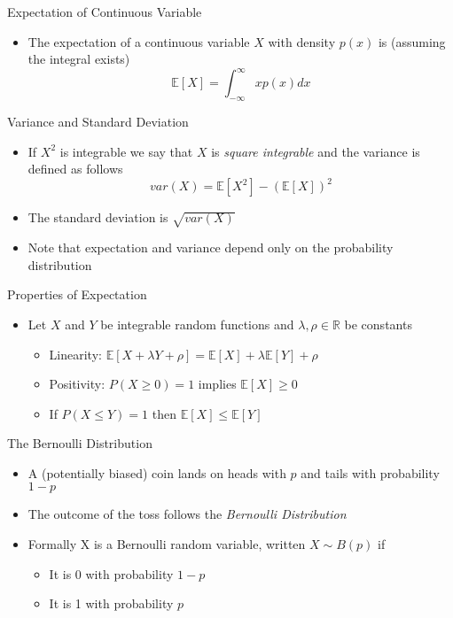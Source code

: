 \documentclass{beamer}
\begin{document}
\begin{frame}{Expectation of Continuous Variable} 
\begin{itemize} 
 \item The expectation of a continuous variable $X$ with density $p(x)$ is (assuming the integral exists) 
 \begin{displaymath} 
  \mathbb{E}[X] = \int_{-\infty}^\infty x p(x) dx
 \end{displaymath}
\end{itemize}
\end{frame}

\begin{frame}{Variance and Standard Deviation} 
\begin{itemize} 
 \item If $X^2$ is integrable we say that $X$ is \emph{square integrable} and the variance is defined as follows 
 \begin{displaymath} 
 var(X) = \mathbb{E}[X^2] - (\mathbb{E}[X])^2  
 \end{displaymath}
 \item The standard deviation is $\sqrt{var(X)}$
 \item Note that expectation and variance depend only on the probability distribution 
\end{itemize}
\end{frame}

\begin{frame}{Properties of Expectation} 
\begin{itemize} 
 \item Let $X$ and $Y$ be integrable random functions and $\lambda, \rho \in \mathbb{R}$ be constants
 \begin{itemize}
 \item Linearity: $\mathbb{E}[X + \lambda Y + \rho] = \mathbb{E}[X] +  \lambda \mathbb{E}[Y] + \rho$ 
 \item Positivity: $P(X \geq 0) = 1$ implies $\mathbb{E}[X] \geq 0$ 
 \item If $P(X \leq Y) = 1$ then $\mathbb{E}[X] \leq \mathbb{E}[Y]$
 \end{itemize}
\end{itemize}
 
\end{frame}


\begin{frame}{The Bernoulli Distribution}
\begin{itemize}
 \item A (potentially biased) coin lands on heads with $p$ and tails with probability $1-p$
\item The outcome of the toss follows the \emph{Bernoulli Distribution} 
\item Formally X is a Bernoulli random variable, written $X \sim B(p)$ if 
\begin{itemize}
\item It is 0 with probability $1-p$ 
\item It is 1 with probability $p$ 
\end{itemize} 
\end{itemize}
\end{frame}
\end{document}

